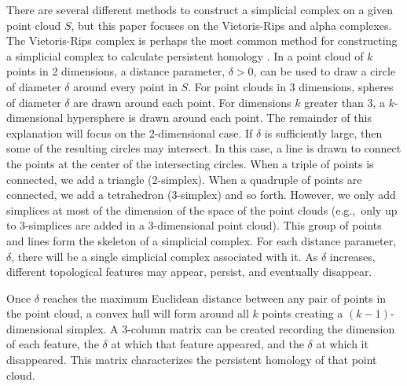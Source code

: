 There are several different methods to construct a simplicial complex on
a given point cloud \(S\), but this paper focuses on the Vietoris-Rips
and alpha complexes. The Vietoris-Rips complex is perhaps the most
common method for constructing a simplicial complex to calculate
persistent homology \citep{Rips-Complex}. In a point cloud of \(k\)
points in 2 dimensions, a distance parameter, \(\delta > 0\), can be
used to draw a circle of diameter \(\delta\) around every point in
\(S\). For point clouds in 3 dimensions, spheres of diameter \(\delta\)
are drawn around each point. For dimensions \(k\) greater than 3, a
\(k\)-dimensional hypersphere is drawn around each point. The remainder
of this explanation will focus on the 2-dimensional case. If \(\delta\)
is sufficiently large, then some of the resulting circles may intersect.
In this case, a line is drawn to connect the points at the center of the
intersecting circles. When a triple of points is connected, we add a
triangle (2-simplex). When a quadruple of points are connected, we add a
tetrahedron (3-simplex) and so forth. However, we only add simplices at
most of the dimension of the space of the point clouds (e.g.,~only up to
3-simplices are added in a 3-dimensional point cloud). This group of
points and lines form the skeleton of a simplicial complex. For each
distance parameter, \(\delta\), there will be a single simplicial
complex associated with it. As \(\delta\) increases, different
topological features may appear, persist, and eventually disappear.

Once \(\delta\) reaches the maximum Euclidean distance between any pair
of points in the point cloud, a convex hull will form around all \(k\)
points creating a \((k-1)\)-dimensional simplex. A 3-column matrix can
be created recording the dimension of each feature, the \(\delta\) at
which that feature appeared, and the \(\delta\) at which it disappeared.
This matrix characterizes the persistent homology of that point cloud.

